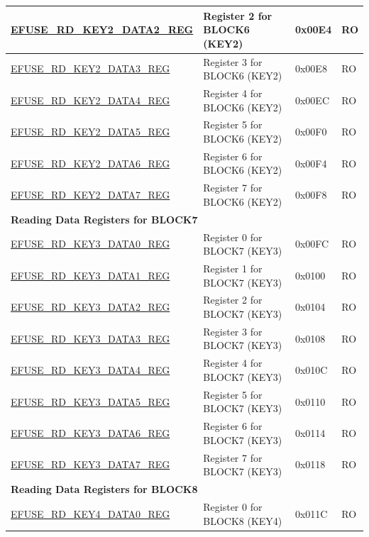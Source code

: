 \begin{longtable}{ | p{7.2cm} | p{6cm} | p{1.3cm} | p{1cm} | }
\hyperref[regdesc:EFUSERDKEY2DATANREG]{EFUSE\_RD\_KEY2\_DATA2\_REG} & Register 2 for BLOCK6 (KEY2) & 0x00E4 & RO \\ \hline
\hyperref[regdesc:EFUSERDKEY2DATANREG]{EFUSE\_RD\_KEY2\_DATA3\_REG} & Register 3 for BLOCK6 (KEY2) & 0x00E8 & RO \\ \hline
\hyperref[regdesc:EFUSERDKEY2DATANREG]{EFUSE\_RD\_KEY2\_DATA4\_REG} & Register 4 for BLOCK6 (KEY2) & 0x00EC & RO \\ \hline
\hyperref[regdesc:EFUSERDKEY2DATANREG]{EFUSE\_RD\_KEY2\_DATA5\_REG} & Register 5 for BLOCK6 (KEY2) & 0x00F0 & RO \\ \hline
\hyperref[regdesc:EFUSERDKEY2DATANREG]{EFUSE\_RD\_KEY2\_DATA6\_REG} & Register 6 for BLOCK6 (KEY2) & 0x00F4 & RO \\ \hline
\hyperref[regdesc:EFUSERDKEY2DATANREG]{EFUSE\_RD\_KEY2\_DATA7\_REG} & Register 7 for BLOCK6 (KEY2) & 0x00F8 & RO \\ \hline
\multicolumn{4}{|l|}{\textbf{Reading Data Registers for BLOCK7}} \\ \hline
\hyperref[regdesc:EFUSERDKEY3DATANREG]{EFUSE\_RD\_KEY3\_DATA0\_REG} & Register 0 for BLOCK7 (KEY3) & 0x00FC & RO \\ \hline
\hyperref[regdesc:EFUSERDKEY3DATANREG]{EFUSE\_RD\_KEY3\_DATA1\_REG} & Register 1 for BLOCK7 (KEY3) & 0x0100 & RO \\ \hline
\hyperref[regdesc:EFUSERDKEY3DATANREG]{EFUSE\_RD\_KEY3\_DATA2\_REG} & Register 2 for BLOCK7 (KEY3) & 0x0104 & RO \\ \hline
\hyperref[regdesc:EFUSERDKEY3DATANREG]{EFUSE\_RD\_KEY3\_DATA3\_REG} & Register 3 for BLOCK7 (KEY3) & 0x0108 & RO \\ \hline
\hyperref[regdesc:EFUSERDKEY3DATANREG]{EFUSE\_RD\_KEY3\_DATA4\_REG} & Register 4 for BLOCK7 (KEY3) & 0x010C & RO \\ \hline
\hyperref[regdesc:EFUSERDKEY3DATANREG]{EFUSE\_RD\_KEY3\_DATA5\_REG} & Register 5 for BLOCK7 (KEY3) & 0x0110 & RO \\ \hline
\hyperref[regdesc:EFUSERDKEY3DATANREG]{EFUSE\_RD\_KEY3\_DATA6\_REG} & Register 6 for BLOCK7 (KEY3) & 0x0114 & RO \\ \hline
\hyperref[regdesc:EFUSERDKEY3DATANREG]{EFUSE\_RD\_KEY3\_DATA7\_REG} & Register 7 for BLOCK7 (KEY3) & 0x0118 & RO \\ \hline
\multicolumn{4}{|l|}{\textbf{Reading Data Registers for BLOCK8}} \\ \hline
\hyperref[regdesc:EFUSERDKEY4DATANREG]{EFUSE\_RD\_KEY4\_DATA0\_REG} & Register 0 for BLOCK8 (KEY4) & 0x011C & RO \\ \hline

\end{longtable}
